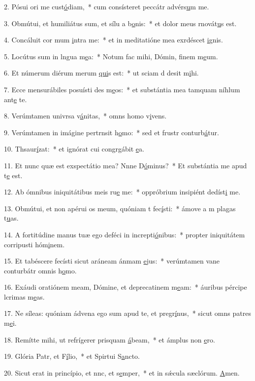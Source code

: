 2. Pósui ori me cust\uline{ó}diam,~* cum consísteret peccátr advérs\uline{u}m me.\par 
3. Obmútui, et humiliátus sum, et sílu a b\uline{o}nis:~* et dolor meus rnovát\uline{u}s est.\par 
4. Concáluit cor mum \uline{i}ntra me:~* et in meditatióne mea exrdéscet \uline{i}gnis.\par 
5. Locútus sum in lngua m\uline{e}a:~* Notum fac mihi, Dómin, finem m\uline{e}um.\par 
6. Et númerum diérum merum \uline{qui}s est:~* ut sciam d desit m\uline{i}hi.\par 
7. Ecce mensurábiles posuísti des m\uline{e}os:~* et substántia mea tamquam níhlum ant\uline{e} te.\par 
8. Verúmtamen univrsa v\uline{á}nitas,~* omns homo v\uline{i}vens.\par 
9. Verúmtamen in imágine pertrnsit h\uline{o}mo:~* sed et frustr conturb\uline{á}tur.\par 
10. Thsaur\uline{í}zat:~* et ignórat cui congrgábit \uline{e}a.\par 
11. Et nunc quæ est exspectátio mea? Nnne D\uline{ó}minus?~* Et substántia me apud t\uline{e} est.\par 
12. Ab ómnibus iniquitátibus meis ru\uline{e} me:~* oppróbrium insipiént dedíst\uline{i} me.\par 
13. Obmútui, et non apérui os meum, quóniam t fec\uline{í}sti:~* ámove a m plagas t\uline{u}as.\par 
14. A fortitúdine manus tuæ ego deféci in increpti\uline{ó}nibus:~* propter iniquitátem corripusti hóm\uline{i}nem.\par 
15. Et tabéscere fecísti sicut aráneam ánmam \uline{e}jus:~* verúmtamen vane conturbátr omnis h\uline{o}mo.\par 
16. Exáudi oratiónem meam, Dómine, et deprecatinem m\uline{e}am:~* áuribus pércipe lcrimas m\uline{e}as.\par 
17. Ne síleas: quóniam ádvena ego sum apud te, et pregr\uline{í}nus,~* sicut omns patres m\uline{e}i.\par 
18. Remítte mihi, ut refrígerer prisquam \uline{á}beam,~* et ámplus non \uline{e}ro.\par 
19. Glória Patr, et F\uline{í}lio,~* et Spirtui S\uline{a}ncto.\par 
20. Sicut erat in princípio, et nnc, et s\uline{e}mper,~* et in sǽcula sæclórum. \uline{A}men.\par 

